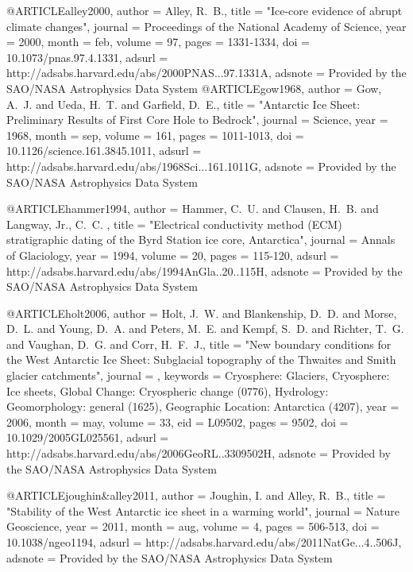 

@ARTICLE{alley2000,
   author = {{Alley}, R.~B.},
    title = "{Ice-core evidence of abrupt climate changes}",
  journal = {Proceedings of the National Academy of Science},
     year = 2000,
    month = feb,
   volume = 97,
    pages = {1331-1334},
      doi = {10.1073/pnas.97.4.1331},
   adsurl = {http://adsabs.harvard.edu/abs/2000PNAS...97.1331A},
  adsnote = {Provided by the SAO/NASA Astrophysics Data System}
}@ARTICLE{gow1968,
   author = {{Gow}, A.~J. and {Ueda}, H.~T. and {Garfield}, D.~E.},
    title = "{Antarctic Ice Sheet: Preliminary Results of First Core Hole to Bedrock}",
  journal = {Science},
     year = 1968,
    month = sep,
   volume = 161,
    pages = {1011-1013},
      doi = {10.1126/science.161.3845.1011},
   adsurl = {http://adsabs.harvard.edu/abs/1968Sci...161.1011G},
  adsnote = {Provided by the SAO/NASA Astrophysics Data System}
}

@ARTICLE{hammer1994,
   author = {{Hammer}, C.~U. and {Clausen}, H.~B. and {Langway}, Jr., C.~C.
	},
    title = "{Electrical conductivity method (ECM) stratigraphic dating of the Byrd Station ice core, Antarctica}",
  journal = {Annals of Glaciology},
     year = 1994,
   volume = 20,
    pages = {115-120},
   adsurl = {http://adsabs.harvard.edu/abs/1994AnGla..20..115H},
  adsnote = {Provided by the SAO/NASA Astrophysics Data System}
}

@ARTICLE{holt2006,
   author = {{Holt}, J.~W. and {Blankenship}, D.~D. and {Morse}, D.~L. and 
	{Young}, D.~A. and {Peters}, M.~E. and {Kempf}, S.~D. and {Richter}, T.~G. and 
	{Vaughan}, D.~G. and {Corr}, H.~F.~J.},
    title = "{New boundary conditions for the West Antarctic Ice Sheet: Subglacial topography of the Thwaites and Smith glacier catchments}",
  journal = {\grl},
 keywords = {Cryosphere: Glaciers, Cryosphere: Ice sheets, Global Change: Cryospheric change (0776), Hydrology: Geomorphology: general (1625), Geographic Location: Antarctica (4207)},
     year = 2006,
    month = may,
   volume = 33,
      eid = {L09502},
    pages = {9502},
      doi = {10.1029/2005GL025561},
   adsurl = {http://adsabs.harvard.edu/abs/2006GeoRL..3309502H},
  adsnote = {Provided by the SAO/NASA Astrophysics Data System}
}

@ARTICLE{joughin&alley2011,
   author = {{Joughin}, I. and {Alley}, R.~B.},
    title = "{Stability of the West Antarctic ice sheet in a warming world}",
  journal = {Nature Geoscience},
     year = 2011,
    month = aug,
   volume = 4,
    pages = {506-513},
      doi = {10.1038/ngeo1194},
   adsurl = {http://adsabs.harvard.edu/abs/2011NatGe...4..506J},
  adsnote = {Provided by the SAO/NASA Astrophysics Data System}
}

